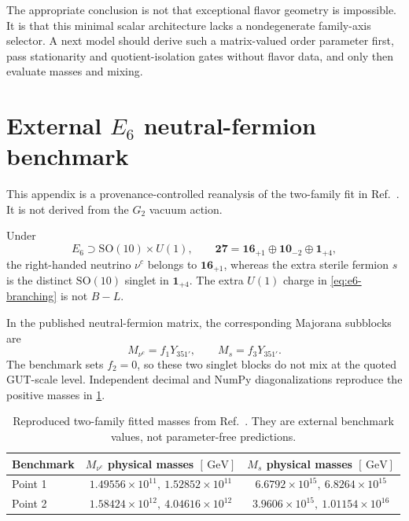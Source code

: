 \documentclass[11pt]{article}
\newcommand{\SO}{\mathrm{SO}}
\newcommand{\GeV}{\,\mathrm{GeV}}
\begin{document}
The appropriate conclusion is not that exceptional flavor geometry is impossible.  It is that this minimal scalar architecture lacks a nondegenerate family-axis selector.  A next model should derive such a matrix-valued order parameter first, pass stationarity and quotient-isolation gates without flavor data, and only then evaluate masses and mixing.

\appendix
\section{External \texorpdfstring{$E_6$}{E6} neutral-fermion benchmark}
\label{app:e6}

This appendix is a provenance-controlled reanalysis of the two-family fit in Ref.~\cite{BabuBajcSusic2015}.  It is not derived from the $G_2$ vacuum action.

Under
\begin{equation}
 E_6\supset \SO(10)\times U(1),\qquad
 \mathbf{27}=\mathbf{16}_{+1}\oplus\mathbf{10}_{-2}\oplus\mathbf{1}_{+4},
 \label{eq:e6-branching}
\end{equation}
the right-handed neutrino $\nu^c$ belongs to $\mathbf{16}_{+1}$, whereas the extra sterile fermion $s$ is the distinct $\SO(10)$ singlet in $\mathbf{1}_{+4}$.  The extra $U(1)$ charge in \cref{eq:e6-branching} is not $B-L$.

In the published neutral-fermion matrix, the corresponding Majorana subblocks are
\begin{equation}
  M_{\nu^c}=f_1Y_{351'},\qquad M_s=f_3Y_{351'}.
  \label{eq:e6-masses}
\end{equation}
The benchmark sets $f_2=0$, so these two singlet blocks do not mix at the quoted GUT-scale level.  Independent decimal and NumPy diagonalizations reproduce the positive masses in \cref{tab:e6-masses}.

\begin{table}[h]
\centering
\caption{Reproduced two-family fitted masses from Ref.~\cite{BabuBajcSusic2015}.  They are external benchmark values, not parameter-free predictions.}
\label{tab:e6-masses}
\begin{tabular}{@{}lcc@{}}
\toprule
Benchmark & $M_{\nu^c}$ physical masses $[\GeV]$ & $M_s$ physical masses $[\GeV]$ \\
\midrule
Point 1 & $1.49556\times10^{11},\ 1.52852\times10^{11}$
        & $6.6792\times10^{15},\ 6.8264\times10^{15}$ \\
Point 2 & $1.58424\times10^{12},\ 4.04616\times10^{12}$
        & $3.9606\times10^{15},\ 1.01154\times10^{16}$ \\
\bottomrule
\end{tabular}
\end{table}
\end{document}
